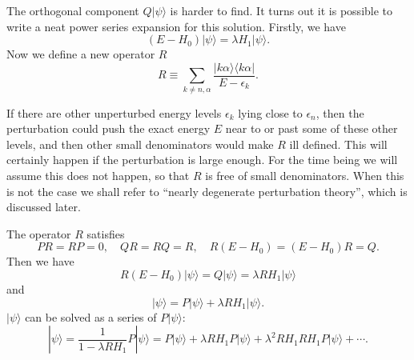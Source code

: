 The orthogonal component $Q|\psi\rangle$ is harder to find. It turns out it is possible to write a neat power series expansion for this solution. Firstly, we have
\[(E-H_0)|\psi\rangle = \lambda H_1 |\psi\rangle.\]
Now we define a new operator $R$
\[R \equiv \sum_{k \neq n,\alpha} \frac{|k\alpha\rangle \langle k\alpha|}{E-\epsilon_k}.\]
\begin{note}
If there are other unperturbed energy levels $\epsilon_k$ lying close to $\epsilon_n$, then the perturbation could push
the exact energy $E$ near to or past some of these other levels, and then other small denominators would make $R$ ill defined.
This will certainly happen if the perturbation is large enough. For the time being we will assume this does not happen, so that $R$ is free of small denominators. When this is not the case we shall refer to ``nearly degenerate perturbation theory'', which is discussed later.
\end{note}
\noindent
The operator $R$ satisfies
\[PR=RP=0 , \quad QR=RQ=R , \quad R(E-H_0) = (E-H_0)R = Q.\]
Then we have
\[R(E-H_0)|\psi\rangle = Q|\psi\rangle = \lambda RH_1 |\psi\rangle \]
and
\[|\psi\rangle = P|\psi\rangle + \lambda R H_1 |\psi\rangle.\]
$|\psi\rangle$ can be solved as a series of $P|\psi\rangle$:
\[|\psi\rangle = \frac{1}{1-\lambda RH_1} P|\psi\rangle = P|\psi\rangle + \lambda RH_1P|\psi\rangle + \lambda^2 RH_1RH_1 P|\psi\rangle + \cdots.\]

